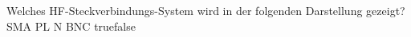     {Welches HF-Steckverbindungs-System wird in der folgenden Darstellung gezeigt? }
    {SMA}
    {PL}
    {N}
    {BNC}
    {true}{false}